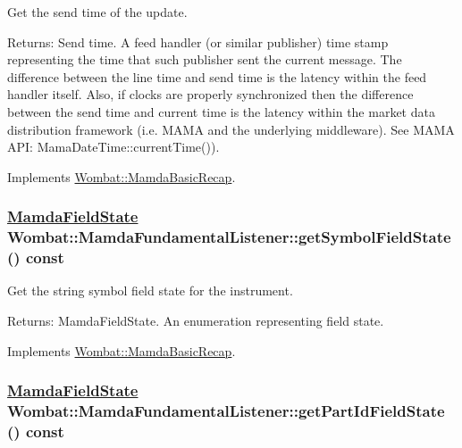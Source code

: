 Get the send time of the update. 

\begin{Desc}
\item[Returns:]Send time. A feed handler (or similar publisher) time stamp representing the time that such publisher sent the current message. The difference between the line time and send time is the latency within the feed handler itself. Also, if clocks are properly synchronized then the difference between the send time and current time is the latency within the market data distribution framework (i.e. MAMA and the underlying middleware). See MAMA API: Mama\-Date\-Time::current\-Time()). \end{Desc}


Implements \hyperlink{classWombat_1_1MamdaBasicRecap_b9425853ac2dfb00d16d68381abae187}{Wombat::Mamda\-Basic\-Recap}.\hypertarget{classWombat_1_1MamdaFundamentalListener_ed5b159cacedf11c8beb00bf02c78561}{
\subsubsection[getSymbolFieldState]{\setlength{\rightskip}{0pt plus 5cm}\hyperlink{namespaceWombat_93aac974f2ab713554fd12a1fa3b7d2a}{Mamda\-Field\-State} Wombat::Mamda\-Fundamental\-Listener::get\-Symbol\-Field\-State () const}}
\label{classWombat_1_1MamdaFundamentalListener_ed5b159cacedf11c8beb00bf02c78561}


Get the string symbol field state for the instrument. 

\begin{Desc}
\item[Returns:]Mamda\-Field\-State. An enumeration representing field state. \end{Desc}


Implements \hyperlink{classWombat_1_1MamdaBasicRecap_95a917a831265cdc29aa0e28d366108a}{Wombat::Mamda\-Basic\-Recap}.\hypertarget{classWombat_1_1MamdaFundamentalListener_0262bf50c2afc8dc41440deeb8ba96cd}{
\subsubsection[getPartIdFieldState]{\setlength{\rightskip}{0pt plus 5cm}\hyperlink{namespaceWombat_93aac974f2ab713554fd12a1fa3b7d2a}{Mamda\-Field\-State} Wombat::Mamda\-Fundamental\-Listener::get\-Part\-Id\-Field\-State () const}}
\label{classWombat_1_1MamdaFundamentalListener_0262bf50c2afc8dc41440deeb8ba96cd}


